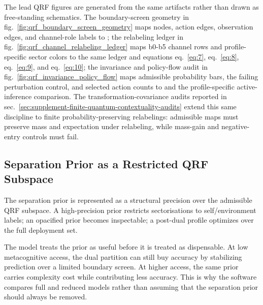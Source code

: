 \documentclass[
]{article}
\begin{document}
The lead QRF figures are generated from the same artifacts rather than
drawn as free-standing schematics. The boundary-screen geometry in
fig.~\ref{fig:qrf_boundary_screen_geometry} maps nodes, action edges,
observation edges, and channel-role labels to
; the relabeling ledger in
fig.~\ref{fig:qrf_channel_relabeling_ledger} maps b0-b5 channel rows and
profile-specific sector colors to the same ledger and equations
eq.~\ref{eq:7}, eq.~\ref{eq:8}, eq.~\ref{eq:9}, and eq.~\ref{eq:10}; the
invariance and policy-flow audit in
fig.~\ref{fig:qrf_invariance_policy_flow} maps admissible probability
bars, the failing perturbation control, and selected action counts to
 and the
profile-specific active-inference comparison. The
transformation-covariance audits reported in
sec.~\ref{sec:supplement-finite-quantum-contextuality-audits} extend
this same discipline to finite probability-preserving relabelings:
admissible maps must preserve mass and expectation under relabeling,
while mass-gain and negative-entry controls must fail.

\subsection{Separation Prior as a Restricted QRF
Subspace}\label{sec:methods-separation-prior-subspace}

The separation prior is represented as a structural precision over the
admissible QRF subspace. A high-precision prior restricts sectorisations
to self/environment labels; an opacified prior becomes inspectable; a
post-dual profile optimizes over the full deployment set.

The model treats the prior as useful before it is treated as
dispensable. At low metacognitive access, the dual partition can still
buy accuracy by stabilizing prediction over a limited boundary screen.
At higher access, the same prior carries complexity cost while
contributing less accuracy. This is why the software compares full and
reduced models rather than assuming that the separation prior should
always be removed.
\end{document}
